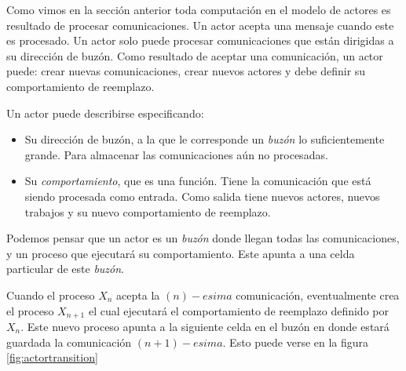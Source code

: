 Como vimos en la sección anterior toda computación en el modelo de actores es resultado de procesar comunicaciones. Un actor acepta una mensaje cuando este es procesado. Un actor solo puede procesar comunicaciones que están dirigidas a su dirección de buzón. Como resultado de aceptar una comunicación, un actor puede: crear nuevas comunicaciones, crear nuevos actores y debe definir su comportamiento de reemplazo.


Un actor puede describirse especificando:

\begin{itemize}
 \item Su dirección de buzón, a la que le corresponde un \textit{buzón} lo suficientemente grande. Para almacenar las comunicaciones aún no procesadas.
 \item Su \textit{comportamiento}, que es una función. Tiene la comunicación que está siendo procesada como entrada. Como salida tiene nuevos actores, nuevos trabajos y su nuevo comportamiento de reemplazo.
\end{itemize}

Podemos pensar que un actor es un \textit{buzón} donde llegan todas las comunicaciones, y un proceso que ejecutará su comportamiento. Este apunta a una celda particular de este \textit{buzón}. 

% 
% 
% 
% 
% 
% 
% 
% 


Cuando el proceso $X_n$ acepta la $(n)-esima$ comunicación, eventualmente crea el proceso $X_{n+1}$ el cual ejecutará el comportamiento de reemplazo definido por $X_n$. Este nuevo proceso apunta a la siguiente celda en el buzón en donde estará guardada la comunicación $(n+1)-esima$. Esto puede verse en la figura \ref{fig:actortransition}

